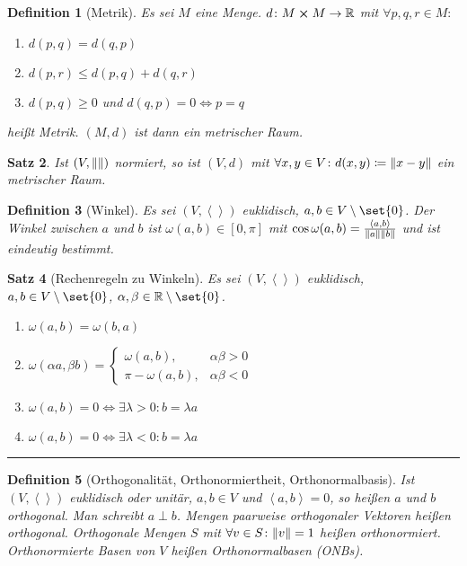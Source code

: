 \documentclass[a4paper]{article}
\newcounter{Sec}
\theoremstyle{marginbreak}
\newtheorem{definition}{Definition}[Sec]
\newtheorem{satz}[definition]{Satz}
\newcommand{\sep}{%
	\rule{\textwidth}{0.3pt}%
	\stepcounter{Sec}%
	}
\newcommand\scp[1]{\left\langle#1\right\rangle}
\begin{document}
	\begin{definition}[Metrik]
		Es sei $M$ eine Menge. $d\colon M\cross M\to\mathbb{R}$ mit $\forall p, q, r\in M\colon$
		\begin{enumerate}[label=(\alph*)]
			\item $d(p, q) = d(q, p)$
			\item $d(p, r) \leq d(p, q) + d(q, r)$
			\item $d(p, q) \geq 0$ und $d(q, p) = 0 \iff p = q$
		\end{enumerate}
		heißt Metrik. $(M, d)$ ist dann ein metrischer Raum.
	\end{definition}
	\begin{satz}
		Ist $(V, \norm{})$ normiert, so ist $(V, d)$ mit $\forall x, y\in V\colon d(x, y)\coloneqq \norm{x - y}$
		ein metrischer Raum.
	\end{satz}
	\begin{definition}[Winkel]
		Es sei $(V, \scp{})$ euklidisch, $a, b\in V\setminus\set{0}$. Der Winkel
		zwischen $a$ und $b$ ist $\omega(a, b)\in[0,\pi]$ mit $\cos\omega(a, b) = \frac{\scp{a, b}}{\norm{a}\norm{b}}$
		und ist eindeutig bestimmt.
	\end{definition}
	\begin{satz}[Rechenregeln zu Winkeln]
		Es sei $(V, \scp{})$ euklidisch, $a, b\in V\setminus\set{0}$, $\alpha, \beta\in\mathbb{R}\setminus\set{0}$.
		\begin{enumerate}[label=(\alph*)]
			\item $\omega(a, b) = \omega(b, a)$
			\item $\omega(\alpha a, \beta b) =
				\begin{cases}
					\omega(a, b), &\alpha\beta > 0\\
					\pi-\omega(a, b), &\alpha\beta < 0
				\end{cases}$
			\item $\omega(a, b) = 0 \iff \exists\lambda > 0\colon b=\lambda a$
			\item $\omega(a, b) = 0 \iff \exists\lambda < 0\colon b=\lambda a$
		\end{enumerate}
	\end{satz}
	\sep
	\begin{definition}[Orthogonalität, Orthonormiertheit, Orthonormalbasis]
		Ist $(V,\scp{})$ euklidisch oder unitär, $a, b\in V$ und $\scp{a, b}=0$,
		so heißen $a$ und $b$ orthogonal. Man schreibt $a\perp b$. Mengen paarweise
		orthogonaler Vektoren heißen orthogonal. Orthogonale Mengen $S$ mit $\forall v\in S\colon \norm{v}=1$
		heißen orthonormiert. Orthonormierte Basen von $V$ heißen Orthonormalbasen (ONBs).
	\end{definition}
\end{document}
